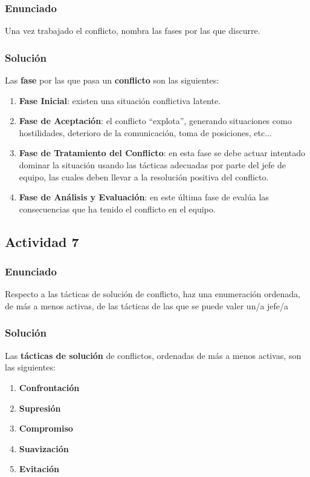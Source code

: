 \subsubsection{Enunciado}
Una vez trabajado el conflicto, nombra las fases por las que discurre.

\subsubsection{Solución}
Las \textbf{fase} por las que pasa un \textbf{conflicto} son las siguientes:

\begin{enumerate}
    \item \textbf{Fase Inicial}: existen una situación conflictiva latente.
    \item \textbf{Fase de Aceptación}: el conflicto ``explota'', generando situaciones como hostilidades, deterioro de la comunicación, toma de posiciones, etc...
    \item \textbf{Fase de Tratamiento del Conflicto}: en esta fase se debe actuar intentado dominar la situación usando las tácticas adecuadas por parte del jefe de equipo, las cuales deben llevar a la resolución positiva del conflicto.
    \item \textbf{Fase de Análisis y Evaluación}: en este última fase de evalúa las consecuencias que ha tenido el conflicto en el equipo.
\end{enumerate}

\subsection{Actividad 7}

\subsubsection{Enunciado}
Respecto a las tácticas de solución de conflicto, haz una enumeración ordenada, de más a menos activas, de las tácticas de las que se puede valer un/a jefe/a

\subsubsection{Solución}
Las \textbf{tácticas de solución} de conflictos, ordenadas de más a menos activas, son las siguientes:

\begin{enumerate}
    \item \textbf{Confrontación}
    \item \textbf{Supresión}
    \item \textbf{Compromiso}
    \item \textbf{Suavización}
    \item \textbf{Evitación}
\end{enumerate}





\newpage



